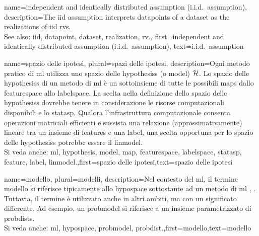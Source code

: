 {name={independent and identically distributed assumption (i.i.d.\ assumption)}, 
	description={The \gls{iid} assumption interprets \glspl{datapoint} of a \gls{dataset} as the 
		\glspl{realization} of \gls{iid} \glspl{rv}.
				\\
		See also: \gls{iid}, \gls{datapoint}, \gls{dataset}, \gls{realization}, \gls{rv}.},
		first={independent and identically distributed assumption (i.i.d.\ assumption)},
		text={i.i.d.\ assumption} 
}

{name={spazio delle ipotesi}, plural={spazi delle ipotesi}, description={Ogni 
		metodo pratico di \gls{ml} utilizza uno spazio delle \glspl{hypothesis} (o \gls{model}) $\mathcal{H}$. Lo spazio delle
		 \glspl{hypothesis} di un metodo di \gls{ml} è un sottoinsieme di tutte le possibili \glspl{map} dallo \gls{featurespace} allo 
		 \gls{labelspace}. 
		La scelta nella definizione dello spazio delle \glspl{hypothesis} dovrebbe tenere in considerazione le risorse computazionali 
		disponibili e lo \gls{statasp}. Qualora l'infrastruttura computazionale consenta operazioni matriciali efficienti e sussista una 
		relazione (approssimativamente) lineare tra un insieme di \glspl{feature} e una \gls{label}, una scelta opportuna per lo 
		spazio delle \glspl{hypothesis} potrebbe essere il \gls{linmodel}.
				\\
		Si veda anche: \gls{ml}, \gls{hypothesis}, \gls{model}, \gls{map}, \gls{featurespace}, \gls{labelspace}, \gls{statasp}, \gls{feature}, \gls{label}, \gls{linmodel}.},first={spazio delle ipotesi},text={spazio delle ipotesi} }
	
{name={modello}, plural={modelli}, description={Nel contesto del \gls{ml}, 
		il termine modello si riferisce tipicamente allo \gls{hypospace} sottostante ad un metodo di
		\gls{ml} \cite{MLBasics}, \cite{ShalevMLBook}. Tuttavia, il termine è utilizzato anche in altri ambiti, ma con un significato 
		differente. Ad esempio, un \gls{probmodel} si riferisce a un insieme parametrizzato di \glspl{probdist}.
						\\
		Si veda anche: \gls{ml}, \gls{hypospace}, \gls{probmodel}, \gls{probdist}.},first={modello},text={modello} }

